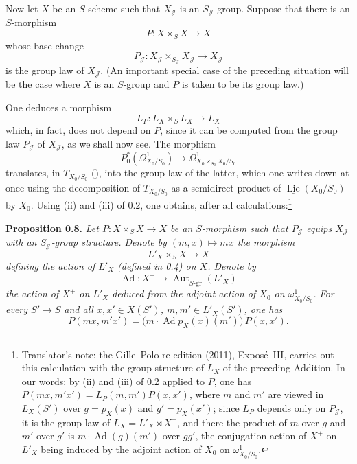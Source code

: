 \medskip
\noindent{}Now let \(X\) be an \(S\)-scheme such that \(X_{\mathscr J}\) is an
\(S_{\mathscr J}\)-group. Suppose that there is an \(S\)-morphism
\[
 P:X\times_S X\longrightarrow X
\]
whose base change
\[
 P_{\mathscr J}:
 X_{\mathscr J}\times_{S_{\mathscr J}}X_{\mathscr J}
 \longrightarrow X_{\mathscr J}
\]
is the group law of \(X_{\mathscr J}\). (An important special case of the
preceding situation will be the case where \(X\) is an \(S\)-group and \(P\)
is taken to be its group law.)

One deduces a morphism
\[
 L_P:L_X\times_S L_X\longrightarrow L_X
\]
which, in fact, does not depend on \(P\), since it can be computed from the
group law \(P_{\mathscr J}\) of \(X_{\mathscr J}\), as we shall now see. The
morphism
\[
 P_0^*(\Omega^1_{X_0/S_0})\longrightarrow
 \Omega^1_{X_0\times_{S_0}X_0/S_0}
\]
translates, in \(T_{X_0/S_0}\) (), into the group law of the latter,
which one writes down at once using the decomposition of \(T_{X_0/S_0}\) as a
semidirect product of \(\underline{\operatorname{Lie}}(X_0/S_0)\) by \(X_0\).
Using (ii) and (iii) of 0.2, one obtains, after all
calculations:\footnote{Translator's note: the Gille--Polo re-edition (2011), Exposé~III, carries out this calculation with the
group structure of \(L_X\) of the preceding Addition. In our words: by (ii)
and (iii) of 0.2 applied to \(P\), one has \(P(mx,m'x')=L_P(m,m')P(x,x')\),
where \(m\) and \(m'\) are viewed in \(L_X(S')\) over \(g=p_X(x)\) and
\(g'=p_X(x')\); since \(L_P\) depends only on \(P_{\mathscr J}\), it is the
group law of \(L_X=L'_X\rtimes X^+\), and there the product of \(m\) over
\(g\) and \(m'\) over \(g'\) is \(m\cdot\operatorname{Ad}(g)(m')\) over
\(gg'\), the conjugation action of \(X^+\) on \(L'_X\) being induced by the
adjoint action of \(X_0\) on \(\omega^1_{X_0/S_0}\).}

\medskip
\noindent{}\textbf{Proposition 0.8.}
\textit{Let \(P:X\times_S X\to X\) be an \(S\)-morphism such that
\(P_{\mathscr J}\) equips \(X_{\mathscr J}\) with an
\(S_{\mathscr J}\)-group structure. Denote by \((m,x)\mapsto mx\) the
morphism}
\[
 L'_X\times_S X\longrightarrow X
\]
\textit{defining the action of \(L'_X\) \textup{(}defined in 0.4\textup{)} on
\(X\). Denote by}
\[
 \operatorname{Ad}:X^+\longrightarrow
 \underline{\operatorname{Aut}}_{S\text{-}\mathrm{gr}}(L'_X)
\]
\textit{the action of \(X^+\) on \(L'_X\) deduced from the adjoint action of
\(X_0\) on \(\omega^1_{X_0/S_0}\). For every \(S'\to S\) and all
\(x,x'\in X(S')\), \(m,m'\in L'_X(S')\), one has}
\[
 P(mx,m'x')=\bigl(m\cdot\operatorname{Ad}p_X(x)(m')\bigr)\,P(x,x').
\]


